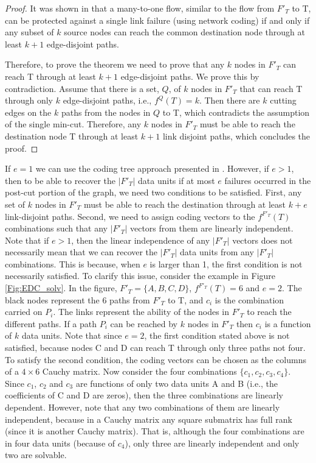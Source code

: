 \documentclass[conference]{IEEEtran}
\begin{document}
\begin{proof}
It was shown in \cite{OA09} that a many-to-one flow, similar to the flow from $F'_T$ to T, can be protected against a single link failure (using network coding) if and only if any subset of $k$ source nodes can reach the common destination node through at least $k+1$ edge-disjoint paths. 

Therefore, to prove the theorem we need to prove that any $k$ nodes in $F'_T$ can reach T through at least $k+1$ edge-disjoint paths. We prove this by contradiction. Assume that there is a set, $Q$, of $k$ nodes in $F'_T$ that can reach T through only $k$ edge-disjoint paths, i.e., $f^Q(T) = k$. Then there are $k$ cutting edges on the $k$ paths from the nodes in $Q$ to T, which contradicts the assumption of the single min-cut. Therefore, any $k$ nodes in $F'_T$ must be able to reach the destination node T through at least $k+1$ link disjoint paths, which concludes the proof.
\end{proof}




If $e=1$ we can use the coding tree approach presented in \cite{OA09}. However, if $e > 1$, then to be able to recover the $|F'_T|$ data units if at most $e$ failures occurred in the post-cut portion of the graph, we need two conditions to be satisfied. First, any set of $k$ nodes in $F'_T$ must be able to reach the destination through at least $k+e$ link-disjoint paths. Second, we need to assign coding vectors to the $f^{F'_T}(T)$ combinations such that any $|F'_T|$ vectors from them are linearly independent. Note that if $e > 1$, then the linear independence of any $|F'_T|$ vectors does not necessarily mean that we can recover the $|F'_T|$ data units from any $|F'_T|$ combinations. This is because, when $e$ is larger than 1, the first condition is not necessarily satisfied. To clarify this issue, consider the example in Figure \ref{Fig:EDC_solv}. In the figure, $F'_T = \{A,B,C,D\}$, $f^{F'_T}(T) = 6$ and $e = 2$. The black nodes represent the 6 paths from $F'_T$ to T, and $c_i$ is the combination carried on $P_i$. The links represent the ability of the nodes in $F'_T$ to reach the different paths. If a path $P_i$ can be reached by $k$ nodes in $F'_T$ then $c_i$ is a function of $k$ data units. Note that since $e=2$, the first condition stated above is not satisfied, because nodes C and D can reach T through only three paths not four. To satisfy the second condition, the coding vectors can be chosen as the columns of a $4 \times 6$ Cauchy matrix. Now consider the four combinations $\{c_1,c_2,c_3,c_4\}$. Since $c_1$, $c_2$ and $c_3$ are functions of only two data units A and B (i.e., the coefficients of C and D are zeros), then the three combinations are linearly dependent. However, note that any two combinations of them are linearly independent, because in a Cauchy matrix any square submatrix has full rank (since it is another Cauchy matrix). That is, although the four combinations are in four data units (because of $c_4$), only three are linearly independent and only two are solvable.
\end{document}
